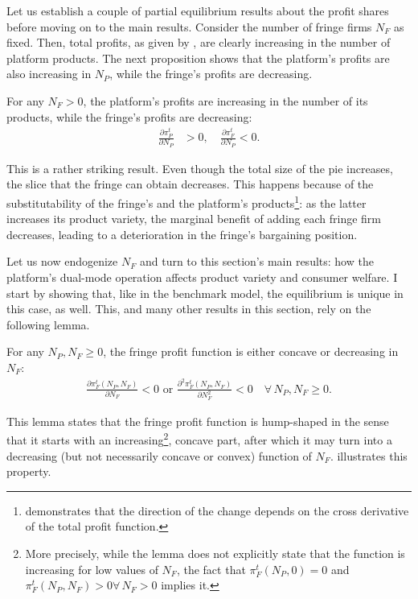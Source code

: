 Let us establish a couple of partial equilibrium results about the profit shares before moving on to the main results.
Consider the number of fringe firms $N_F$ as fixed.
Then, total profits, as given by , are clearly increasing in the number of platform products.
The next proposition shows that the platform's profits are also increasing in $N_P$, while the fringe's profits are decreasing.
\begin{proposition}
    \label{prop:profits_partial_bargaining}
    For any $N_F > 0$, the platform's profits are increasing in the number of its products, while the fringe's profits are decreasing:
    \begin{align*}
        \frac{\partial \pi_P^t}{\partial N_P} &> 0, \quad \frac{\partial \pi_F^t}{\partial N_P} < 0.
    \end{align*}
\end{proposition}
This is a rather striking result.
Even though the total size of the pie increases, the slice that the fringe can obtain decreases.
This happens because of the substitutability of the fringe's and the platform's products\footnote{
     demonstrates that the direction of the change depends on the cross derivative of the total profit function.
}: as the latter increases its product variety, the marginal benefit of adding each fringe firm decreases, leading to a deterioration in the fringe's bargaining position.

Let us now endogenize $N_F$ and turn to this section's main results: how the platform's dual-mode operation affects product variety and consumer welfare.
I start by showing that, like in the benchmark model, the equilibrium is unique in this case, as well.
This, and many other results in this section, rely on the following lemma.
\begin{lemma}
    \label{lem:shape_of_fringe_profit}
    For any $N_P, N_F \geq 0$, the fringe profit function is either concave or decreasing in $N_F$:
    \begin{align*}
        \frac{\partial \pi_F^t(N_P, N_F)}{\partial N_F} < 0 \text{ or } \frac{\partial^2 \pi_F^t(N_P, N_F)}{\partial N_F^2} < 0 \quad \forall\, N_P, N_F \geq 0.
    \end{align*}
\end{lemma}
This lemma states that the fringe profit function is hump-shaped in the sense that it starts with an increasing\footnote{
 More precisely, while the lemma does not explicitly state that the function is increasing for low values of $N_F$, the fact that $\pi_F^t(N_P, 0) = 0$ and $\pi_F^t(N_P, N_F) > 0 \forall\, N_F > 0$ implies it.
}, concave part, after which it may turn into a decreasing (but not necessarily concave or convex) function of $N_F$.
 illustrates this property.

